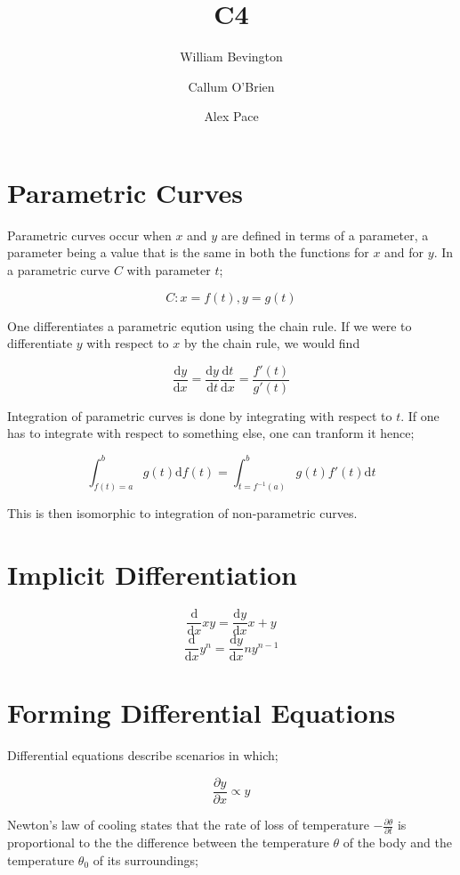 \documentclass{article}
\title{C4}
\author{William Bevington \and Callum O'Brien \and Alex Pace}
\begin{document}
\maketitle
\tableofcontents
\newpage

\section{Parametric Curves}

Parametric curves occur when \(x\) and \(y\) are defined in terms of a parameter, a parameter being a value that is the same in both the functions for \(x\) and for \(y\). In a parametric curve \(C\) with parameter \(t\);

\[C:x=f(t),y=g(t)\]

\noindent One differentiates a parametric eqution using the chain rule. If we were to differentiate \(y\) with respect to \(x\) by the chain rule, we would find

\[\frac{\textrm{d}y}{\textrm{d}x}=\frac{\textrm{d}y}{\textrm{d}t}\frac{\textrm{d}t}{\textrm{d}x}=\frac{f'(t)}{g'(t)}\]

\noindent Integration of parametric curves is done by integrating with respect to \(t\). If one has to integrate with respect to something else, one can tranform it hence;

\[\int_{f(t)=a}^{b}g(t)\textrm{d}f(t)=\int_{t=f^{-1}(a)}^{b}g(t)f'(t)\textrm{d}t\]

\noindent This is then isomorphic to integration of non-parametric curves.

\section{Implicit Differentiation}

\[\frac{\textrm{d}}{\textrm{d}x}xy=\frac{\textrm{d}y}{\textrm{d}x}x+y\]
\[\frac{\textrm{d}}{\textrm{d}x}y^n=\frac{\textrm{d}y}{\textrm{d}x}ny^{n-1}\]

\section{Forming Differential Equations}

Differential equations describe scenarios in which;

\[\frac{\partial y}{\partial x}\propto y\]

\noindent Newton's law of cooling states that the rate of loss of temperature $-\frac{\partial\theta}{\partial t}$ is proportional to the the difference between the temperature $\theta$ of the body and the temperature $\theta_0$ of its surroundings;
\end{document}
